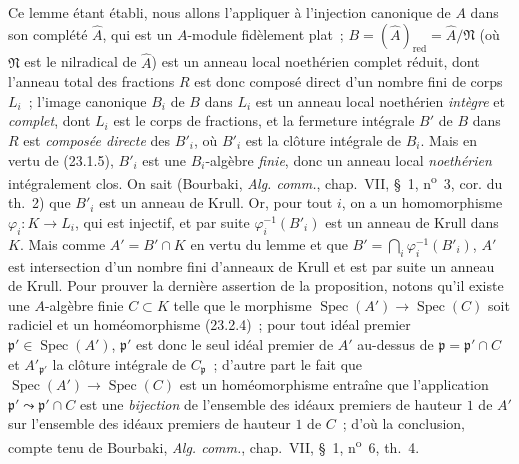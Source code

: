 Ce lemme étant établi, nous allons l'appliquer à l'injection canonique de $A$
dans son complété $\widehat A$, qui est un $A$-module fidèlement plat~;
$B=(\widehat A)_{\mathrm{red}}=\widehat A/\mathfrak N$ (où $\mathfrak N$ est
le nilradical de $\widehat A$) est un anneau local noethérien complet réduit,
dont l'anneau total des
fractions $R$ est donc composé direct d'un nombre fini de corps $L_i$~;
l'image canonique $B_i$ de $B$ dans $L_i$ est un anneau local noethérien
\emph{intègre} et \emph{complet}, dont $L_i$ est le corps de fractions, et la
fermeture intégrale $B'$ de $B$ dans $R$ est \emph{composée directe} des
$B'_i$, où $B'_i$ est la clôture intégrale de $B_i$. Mais en vertu de
(23.1.5), $B'_i$ est une $B_i$-algèbre \emph{finie}, donc un anneau local
\emph{noethérien} intégralement clos. On sait (Bourbaki,
\emph{Alg. comm.}, chap.~VII, §~1, n\textsuperscript{o}~3, cor. du th.~2) que
$B'_i$ est un anneau de Krull. Or, pour tout $i$, on a un homomorphisme
$\varphi_i:K\to L_i$, qui est injectif, et par suite
$\varphi_i^{-1}(B'_i)$ est un anneau de Krull dans $K$. Mais comme
$A'=B'\cap K$ en vertu du lemme et que
$B'=\bigcap_i\varphi_i^{-1}(B'_i)$, $A'$ est intersection d'un nombre fini
d'anneaux de Krull et est par suite un anneau de Krull.
Pour prouver la dernière assertion de la proposition, notons qu'il existe une
$A$-algèbre finie $C\subset K$ telle que le morphisme
$\operatorname{Spec}(A')\to\operatorname{Spec}(C)$ soit radiciel et un
homéomorphisme (23.2.4)~; pour tout idéal premier
$\mathfrak p'\in\operatorname{Spec}(A')$, $\mathfrak p'$ est donc le seul
idéal premier de $A'$ au-dessus de $\mathfrak p=\mathfrak p'\cap C$ et
$A'_{\mathfrak p'}$ la clôture intégrale de $C_{\mathfrak p}$~; d'autre part
le fait que $\operatorname{Spec}(A')\to\operatorname{Spec}(C)$ est un
homéomorphisme entraîne que l'application
$\mathfrak p'\leadsto\mathfrak p'\cap C$ est une \emph{bijection} de l'ensemble des
idéaux premiers de hauteur $1$ de $A'$ sur l'ensemble des idéaux premiers de
hauteur $1$ de $C$~; d'où la conclusion, compte tenu de Bourbaki,
\emph{Alg. comm.}, chap.~VII, §~1, n\textsuperscript{o}~6, th.~4.

